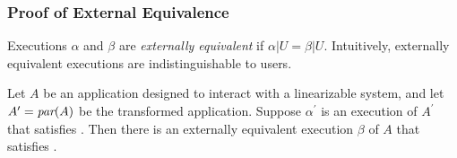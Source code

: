 \subsubsection{Proof of External Equivalence}

Executions $\alpha$ and $\beta$ are
\textit{externally equivalent} if $\alpha|U = \beta|U$. Intuitively,
externally equivalent executions are indistinguishable to users.

\begin{thm}
Let $A$ be an application designed to interact with a linearizable system,
and let $A^\prime = \operatorname*{\textit{par}}(A)$ be the transformed application. Suppose
$\alpha^\prime$ is an execution of $A^\prime$ that satisfies
\MDL{}. Then there is an externally equivalent execution $\beta$
of $A$ that satisfies \SDL{}.
\end{thm}

